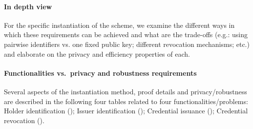 \paragraph{In depth view}
For the specific instantiation of the scheme, we examine the different ways in which these requirements can be achieved and what are the trade-offs (e.g.: using pairwise identifiers vs. one fixed public key; different revocation mechanisms; etc.) and elaborate on the privacy and efficiency properties of each. 



\paragraph{Functionalities vs.\ privacy and robustness requirements}
Several aspects of the instantiation method, proof details and privacy/robustness are described in the following four tables related to four functionalities/problems:
Holder identification (); 
Issuer identification ();
Credential issuance ();
Credential revocation ().



\begingroup

\newcommand{\begminB}[1]{\begmin{#1}\setlist[itemize]{leftmargin=1.5ex}\renewcommand{\labelitemi}{-}}

\def\mystrut{\rule[-.25em]{0pt}{1pt}} %

\newenvironment{funcprivtabular}[3]{\centering\footnotesize
		\nolinenumbers\begin{tabular}{%
			|>{\begminB{#1}}l<{\mystrut\myendmini}|%
			>{\begminB{#2}}l<{\myendmini}|%
			>{\begminB{#3}}l|}
		}{\end{tabular}\vspace{1em}}

\let\temprowend\rowend
\renewcommand{\rowend}{\temprowend}


